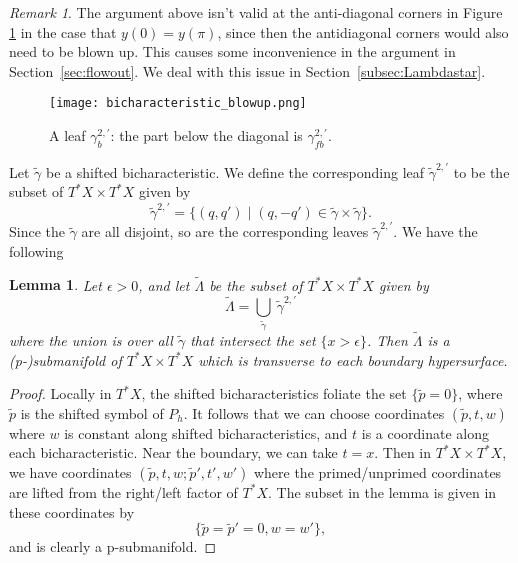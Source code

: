 \documentclass[10pt, a4paper, twoside]{amsart}
\numberwithin{equation}{section}
\newtheorem{lemma}[theorem]{Lemma}
\theoremstyle{remark}
\newtheorem{remark}[theorem]{Remark}
\begin{document}
\begin{remark}The argument above isn't valid at the anti-diagonal corners in Figure \ref{fig: leaves} in the case that $y(0) = y(\pi)$, since then the antidiagonal corners would also need to be blown up. This causes some inconvenience in the argument in Section~\ref{sec:flowout}. 
We deal with this issue in Section~\ref{subsec:Lambdastar}. 
\end{remark}

\begin{center}\begin{figure}
 \texttt{[image: bicharacteristic\_blowup.png]}\caption{\label{fig: leaves}A leaf $\gamma_b^{2, \prime}$: the part below the diagonal is ${\gamma^{2,\prime}_{fb}}$.}\end{figure} \end{center}
 
Let ${\tilde \gamma}$ be a shifted bicharacteristic. We define the corresponding leaf ${\tilde \gamma}^{2, \prime}$ to be the subset of $T^* X \times T^* X$ given by
\begin{equation}
{\tilde \gamma}^{2,\prime} = \{ (q, q') \mid (q, -q') \in {\tilde \gamma} \times {\tilde \gamma} \}.
\end{equation}
Since the ${\tilde \gamma}$ are all disjoint, so are the corresponding leaves ${\tilde \gamma}^{2, \prime}$. We have the following

\begin{lemma}\label{lem:int-shifted-leaves}
Let $\epsilon > 0$, and let $\tilde\Lambda$ be the subset of $T^* X \times T^* X$ given by
$$
\tilde\Lambda = \bigcup_{\tilde \gamma} \  {\tilde \gamma}^{2, \prime}
$$
where the union is over all ${\tilde \gamma}$ that intersect the set $\{ x > \epsilon \}$. Then $\tilde\Lambda$ is a (p-)submanifold of $T^* X \times T^* X$ which is transverse to each boundary hypersurface.
\end{lemma}

\begin{proof} Locally in $T^* X$, the shifted bicharacteristics foliate the set $\{ \tilde p = 0 \}$, where $\tilde p$ is the shifted symbol of $P_h$. It follows that we can choose coordinates $(\tilde p, t, w)$ where $w$ is constant along shifted bicharacteristics, and $t$ is a coordinate along each bicharacteristic. Near the boundary, we can take $t=x$.  Then in $T^* X \times T^* X$, we have coordinates $(\tilde p, t, w; \tilde p', t', w')$ where the primed/unprimed coordinates are lifted from the right/left factor of $T^* X$. The subset in the lemma is given in these coordinates by
$$
\{ \tilde p = \tilde p' = 0, w = w' \},
$$
and is clearly a p-submanifold.
\end{proof}
\end{document}
